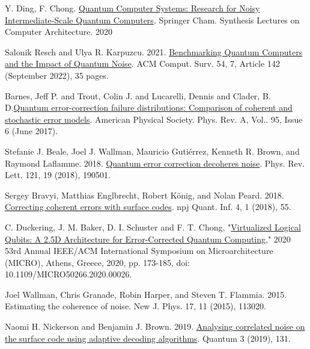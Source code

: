 \documentclass [12pt]{article}
\begin{document}





\begin{thebibliography}{1}
    Y. Ding, F. Chong. \href{https://link.springer.com/book/10.1007/978-3-031-01765-0}{Quantum Computer Systems: Research for Noisy Intermediate-Scale Quantum Computers}. Springer Cham. Synthesis Lectures on Computer Architecture. 2020

    Salonik Resch and Ulya R. Karpuzcu. 2021. \href{https://dl-acm-org.ezproxy.library.tufts.edu/doi/10.1145/3464420}{Benchmarking Quantum Computers and the Impact of Quantum Noise}. ACM Comput. Surv. 54, 7, Article 142 (September 2022), 35 pages.

    Barnes, Jeff P. and Trout, Colin J. and Lucarelli, Dennis and Clader, B. D.\href{https://arxiv.org/abs/1704.03961}{Quantum error-correction failure distributions: Comparison of coherent and stochastic error models}. American Physical Society. Phys. Rev. A, Vol.. 95, Issue 6 (June 2017).

    Stefanie J. Beale, Joel J. Wallman, Mauricio Gutiérrez, Kenneth R. Brown, and Raymond Laflamme. 2018. \href{https://link.aps.org/accepted/10.1103/PhysRevLett.121.190501}{Quantum
    error correction decoheres noise}. Phys. Rev. Lett. 121, 19 (2018), 190501.

    Sergey Bravyi, Matthias Englbrecht, Robert König, and Nolan Peard. 2018. \href{https://www.nature.com/articles/s41534-018-0106-y}{Correcting coherent errors with surface
    codes}. npj Quant. Inf. 4, 1 (2018), 55.

    C. Duckering, J. M. Baker, D. I. Schuster and F. T. Chong, "\href{https://ieeexplore-ieee-org.ezproxy.library.tufts.edu/document/9251988}{Virtualized Logical Qubits: A 2.5D Architecture for Error-Corrected Quantum Computing}," 2020 53rd Annual IEEE/ACM International Symposium on Microarchitecture (MICRO), Athens, Greece, 2020, pp. 173-185, doi: 10.1109/MICRO50266.2020.00026.

    Joel Wallman, Chris Granade, Robin Harper, and Steven T. Flammia. 2015. Estimating the coherence of noise. New J. Phys. 17, 11 (2015), 113020.

    Naomi H. Nickerson and Benjamin J. Brown. 2019. \href{https://arxiv.org/abs/1712.00502}{Analysing correlated noise on the surface code using adaptive decoding algorithms}. Quantum 3 (2019), 131.


\end{thebibliography}
\end{document}

